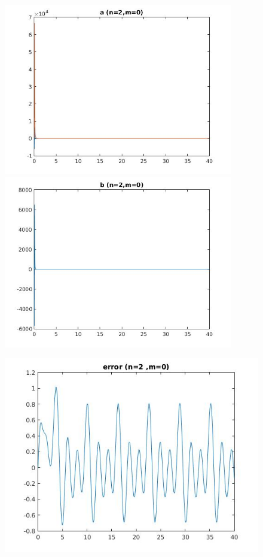 \documentclass{article}
\begin{document}
\clearpage
\large
\begin{figure}[h!]
\centering 
 	  \begin{minipage}{0.48\textwidth}
     \centering
     \advance\leftskip-4cm
  \includegraphics[width=100mm,scale=2]{assets/try20o.jpg}
   \end{minipage} \hfill
    \begin{minipage}{0.48\textwidth}
  \includegraphics[width=100mm,scale=2]{assets/try20oo.jpg}
  \end{minipage}
\end{figure}
\begin{figure}[h!]
\centering
\advance\leftskip-0.5cm
 \includegraphics[width=130mm,scale=2]{assets/try20ooo.jpg}
\end{figure}
\end{document}
